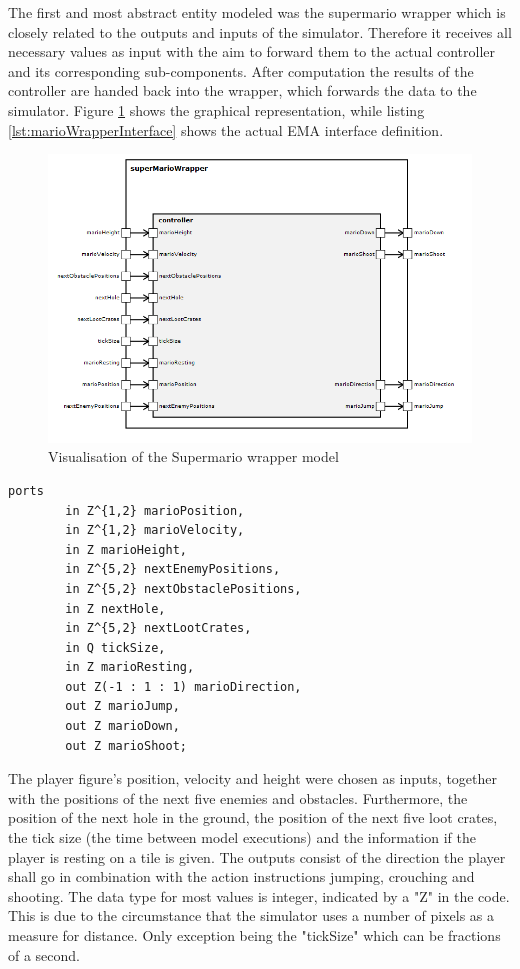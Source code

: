The first and most abstract entity modeled was the supermario wrapper which is closely related to the outputs and inputs of the simulator. Therefore it receives all necessary values as input with the aim to forward them to the actual controller and its corresponding sub-components. After computation the results of the controller are handed back into the wrapper, which forwards the data to the simulator. Figure \ref{fig:marioWrapper} shows the graphical representation, while listing \ref{lst:marioWrapperInterface} shows the actual EMA interface definition.
\begin{figure}
	\centering
	\includegraphics[scale=0.5]{pictures/haller_supermariowrapper.PNG}
	\caption{Visualisation of the Supermario wrapper model}
	\label{fig:marioWrapper}
\end{figure}

\begin{lstlisting}[label=lst:marioWrapperInterface, caption=Interface of the Supermario Wrapper, morekeywords={ports, port, connect, in, out, instance, ->},
frame=single,float,floatplacement=H]
    ports   
        in Z^{1,2} marioPosition,
        in Z^{1,2} marioVelocity,
        in Z marioHeight,
        in Z^{5,2} nextEnemyPositions,
        in Z^{5,2} nextObstaclePositions,
        in Z nextHole,
        in Z^{5,2} nextLootCrates,
        in Q tickSize,
        in Z marioResting,
        out Z(-1 : 1 : 1) marioDirection,
        out Z marioJump,
        out Z marioDown,
        out Z marioShoot;
\end{lstlisting}

The player figure's position, velocity and height were chosen as inputs, together with the positions of the next five enemies and obstacles. Furthermore, the position of the next hole in the ground, the position of the next five loot crates, the tick size (the time between model executions) and the information if the player is resting on a tile is given.
The outputs consist of the direction the player shall go in combination with the action instructions jumping, crouching and shooting.
The data type for most values is integer, indicated by a "Z" in the code. This is due to the circumstance that the simulator uses a number of pixels as a measure for distance. Only exception being the "tickSize" which can be fractions of a second.

